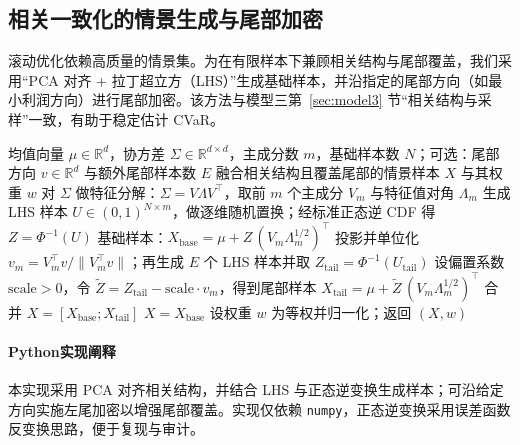 \clearpage

\subsection{相关一致化的情景生成与尾部加密}
滚动优化依赖高质量的情景集。为在有限样本下兼顾相关结构与尾部覆盖，我们采用“PCA 对齐 + 拉丁超立方（LHS）”生成基础样本，并沿指定的尾部方向（如最小利润方向）进行尾部加密。该方法与模型三第~\ref{sec:model3} 节“相关结构与采样”一致，有助于稳定估计 CVaR。
\begin{algorithm}[H]
  \caption{相关一致化的情景生成（PCA + LHS）与尾部加密}
  \label{lst:m3-scenario-pca}
  \begin{algorithmic}[1]
    \Require 均值向量 $\mu\in\mathbb{R}^d$，协方差 $\Sigma\in\mathbb{R}^{d\times d}$，主成分数 $m$，基础样本数 $N$；可选：尾部方向 $v\in\mathbb{R}^d$ 与额外尾部样本数 $E$
    \Ensure 融合相关结构且覆盖尾部的情景样本 $X$ 与其权重 $w$
    \State 对 $\Sigma$ 做特征分解：$\Sigma=V\Lambda V^\top$，取前 $m$ 个主成分 $V_m$ 与特征值对角 $\Lambda_m$
    \State 生成 LHS 样本 $U\in(0,1)^{N\times m}$，做逐维随机置换；经标准正态逆 CDF 得 $Z=\Phi^{-1}(U)$
    \State 基础样本：$X_{\text{base}}=\mu + Z\,(V_m\Lambda_m^{1/2})^\top$
      \State 投影并单位化 $v_m= V_m^\top v/\|V_m^\top v\|$；再生成 $E$ 个 LHS 样本并取 $Z_{\text{tail}}=\Phi^{-1}(U_{\text{tail}})$
      \State 设偏置系数 $\text{scale}>0$，令 $\tilde Z=Z_{\text{tail}}-\text{scale}\cdot v_m$，得到尾部样本 $X_{\text{tail}}=\mu + \tilde Z\,(V_m\Lambda_m^{1/2})^\top$
      \State 合并 $X=[X_{\text{base}}; X_{\text{tail}}]$
    \Else
      \State $X= X_{\text{base}}$
    \EndIf
    \State 设权重 $w$ 为等权并归一化；返回 $(X,w)$
  \end{algorithmic}
\end{algorithm}
\paragraph{Python实现阐释}
本实现采用 PCA 对齐相关结构，并结合 LHS 与正态逆变换生成样本；可沿给定方向实施左尾加密以增强尾部覆盖。实现仅依赖 \texttt{numpy}，正态逆变换采用误差函数反变换思路，便于复现与审计。

\newpage
\begin{center}
\begin{minipage}[t][\dimexpr\textheight-1em\relax]{0.98\linewidth}

\end{minipage}
\end{center}

